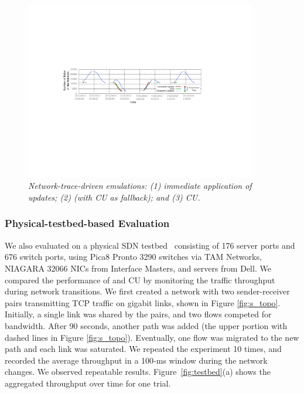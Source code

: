 \begin{figure}[!ht]
  \vspace{-0.1in}
  \centering
  \includegraphics[width=0.9\textwidth]{figs/count.pdf}
  \vspace{-0.15in}
  \caption{\em Network-trace-driven emulations: (1) immediate application of updates; (2) \name (with CU as fallback); and (3) CU.}
  \vspace{-0.2in}
  \label{fig:cise}
\end{figure}


\subsubsection{Physical-testbed-based Evaluation}
We also evaluated \name on a physical SDN testbed~\cite{ocean}
consisting of 176 server ports and 676 switch ports, using Pica8 Pronto 3290 switches via TAM Networks, NIAGARA 32066 NICs from Interface Masters, and servers from Dell.
We compared the performance of \name and CU by monitoring the traffic
throughput during network transitions. We first created a network
with two sender-receiver pairs transmitting TCP traffic on gigabit links, 
shown in Figure \ref{fig:s_topo}. Initially, a single link was shared by the
pairs, and two flows competed for bandwidth.  After 90 seconds, another path
was added %
(the upper portion with dashed lines in
Figure \ref{fig:s_topo}). Eventually, one flow was migrated to
the new path and each link was saturated. 
We repeated the experiment 10 times, and recorded the average throughput in a 100-ms window during the network changes. We observed repeatable results.  Figure~\ref{fig:testbed}(a) shows the aggregated
throughput over time for one trial.

